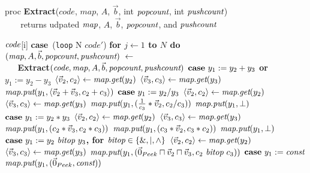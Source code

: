 \begin{algorithm}
proc {\bf Extract}($code$, $map$, $A$, $\vec b$, int $\mbox{\it popcount}$, int $\mbox{\it pushcount}$) \\
\verb+   + returns udpated $\mbox{\it map}$, $A$, ${\vec b}$, $\mbox{\it popcount}$, and $\mbox{\it pushcount}$ \\ \vspace{-12pt}
\begin{algorithmic}
 $\mbox{\it code}$[i]
\IND
\STATE \mbox{\bf case}~({\tt loop} N $code'$)
\IND
\STATE \bf{for} $j \leftarrow 1$ to $N$ {\bf do}
\IND
\STATE $(\mbox{\it map}, A, {\vec b}, \mbox{\it popcount}, \mbox{\it pushcount})~\leftarrow~$ \\
\verb+   +\bf{Extract}$(\mbox{\it code}, \mbox{\it map}, A, {\vec b}, \mbox{\it popcount}, \mbox{\it pushcount})$
\UND
\UND
\STATE \vspace{-6pt}
\STATE $\mbox{\bf case}~ y_1 := y_2 + y_3$ or $y_1 := y_2 - y_3$
\IND
\STATE $\langle{\vec v_2}, {c_2}\rangle \leftarrow \mbox{\it map}.\mbox{\it get}(y_2)$
\STATE $\langle{\vec v_3}, {c_3}\rangle \leftarrow \mbox{\it map}.\mbox{\it get}(y_3)$
\STATE $\mbox{\it map}.\mbox{\it put}(y_1, \langle{\vec v_2+\vec v_3}, {c_2+c_3}\rangle)$
\UND
\STATE \vspace{-6pt}
\STATE $\mbox{\bf case}~y_1 := y_2 / y_3$
\IND
\STATE $\langle{\vec v_2}, {c_2}\rangle \leftarrow \mbox{\it map}.\mbox{\it get}(y_2)$
\STATE $\langle{\vec v_3}, {c_3}\rangle \leftarrow \mbox{\it map}.\mbox{\it get}(y_3)$
\STATE $\mbox{\it map}.\mbox{\it put}(y_1, (\frac{1}{c_3}*\vec v_2, c_2/c_3))$
\ELSE
\STATE $\mbox{\it map}.\mbox{\it put}(y_1, \bot)$
\ENDIF
\UND
\STATE \vspace{-6pt}
\STATE $\mbox{\bf case}~y_1 := y_2 * y_3$
\IND
\STATE $\langle{\vec v_2}, {c_2}\rangle \leftarrow \mbox{\it map}.\mbox{\it get}(y_2)$
\STATE $\langle{\vec v_3}, {c_3}\rangle \leftarrow \mbox{\it map}.\mbox{\it get}(y_3)$
\STATE $\mbox{\it map}.\mbox{\it put}(y_1, (c_2*\vec v_3, c_2*c_3))$
\STATE $\mbox{\it map}.\mbox{\it put}(y_1, (c_3*\vec v_2, c_3*c_2))$
\ELSE
\STATE $\mbox{\it map}.\mbox{\it put}(y_1, \bot)$
\ENDIF
\UND
\STATE \vspace{-6pt}
\STATE $\mbox{\bf case}~y_1 := y_2 ~\mbox{\it bitop}~ y_3$, for $\mbox{\it bitop} \in \{\&, |, \wedge\}$
\IND
\STATE $\langle{\vec v_2}, {c_2}\rangle \leftarrow \mbox{\it map}.\mbox{\it get}(y_2)$
\STATE $\langle{\vec v_3}, {c_3}\rangle \leftarrow \mbox{\it map}.\mbox{\it get}(y_3)$
\STATE $\mbox{\it map}.\mbox{\it put}(y_1, (\vec 0_{Peek} \sqcap \vec v_2 \sqcap \vec v_3, c_2 ~\mbox{\it bitop}~ c_3))$
\UND
\STATE \vspace{-6pt}
\STATE $\mbox{\bf case}~y_1 := \mbox{\it const}$
\IND
\STATE $\mbox{\it map}.\mbox{\it put}(y_1, (\vec 0_{Peek}, \mbox{\it const}))$

\end{algorithmic}
\end{algorithm}
